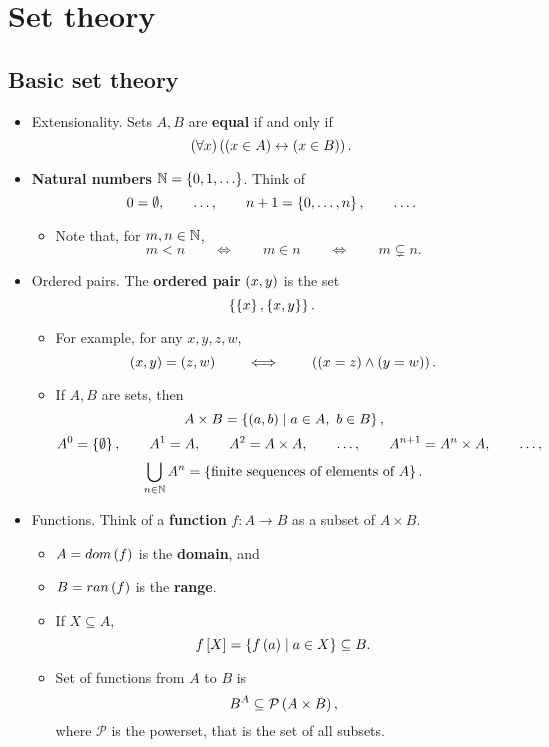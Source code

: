 \pagebreak

\section{Set theory}

\setcounter{subsection}{-1}

\subsection{Basic set theory}

\begin{itemize}
\item Extensionality. Sets $ A, B $ are \textbf{equal} if and only if
$$ \left( \forall x \right)\left( \left( x \in A \right) \leftrightarrow \left( x \in B \right) \right). $$
\item \textbf{Natural numbers} $ \N = \cb{0, 1, \dots} $. Think of
$$ 0 = \emptyset, \qquad \dots, \qquad n + 1 = \left\{ 0, \dots, n \right\}, \qquad \dots. $$
\begin{itemize}
\item Note that, for $ m, n \in \mathbb{N} $,
$$ m < n \qquad \iff \qquad m \in n \qquad \iff \qquad m \subsetneq n. $$
\end{itemize}
\item Ordered pairs. The \textbf{ordered pair} $ \left( x, y \right) $ is the set
$$ \left\{ \left\{ x \right\}, \left\{ x, y \right\} \right\}. $$
\begin{itemize}
\item For example, for any $ x, y, z, w $,
$$ \left( x, y \right) = \left( z, w \right) \qquad \iff \qquad \left( \left( x = z \right) \land \left( y = w \right) \right). $$
\item If $ A, B $ are sets, then
$$ A \times B = \left\{ \left( a, b \right) \mid a \in A, \ b \in B \right\}, $$
$$ A^0 = \left\{ \emptyset \right\}, \qquad A^1 = A, \qquad A^2 = A \times A, \qquad \dots, \qquad A^{n + 1} = A^n \times A, \qquad \dots, $$
$$ \bigcup_{n \in \mathbb{N}} A^n = \left\{ \text{finite sequences of elements of} \ A \right\}. $$
\end{itemize}
\item Functions. Think of a \textbf{function} $ f : A \to B $ as a subset of $ A \times B $.
\begin{itemize}
\item $ A = dom\left( f \right) $ is the \textbf{domain}, and
\item $ B = ran\left( f \right) $ is the \textbf{range}.
\item If $ X \subseteq A $,
$$ f\left[ X \right] = \left\{ f\left( a \right) \mid a \in X \right\} \subseteq B. $$
\item Set of functions from $ A $ to $ B $ is
$$ B^A \subseteq \mathcal{P}\left( A \times B \right), $$
where $ \mathcal{P} $ is the powerset, that is the set of all subsets.
\end{itemize}
\end{itemize}


